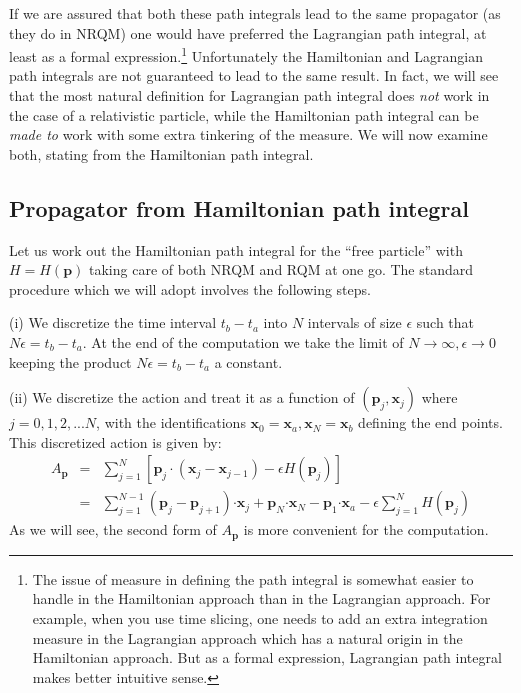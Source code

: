 \documentclass{article}
\begin{document}
 If we are assured that both these path integrals lead to the same propagator (as they do in NRQM) one would have  preferred the Lagrangian path integral, at least as a formal expression.\footnote{The issue of measure in defining the path integral is somewhat easier to handle in the Hamiltonian approach than in the Lagrangian approach. For example, when you use time slicing, one needs to add an extra integration measure in the Lagrangian approach which has a natural origin in the Hamiltonian approach. But as a formal expression, Lagrangian path integral makes better intuitive sense.} Unfortunately the Hamiltonian and Lagrangian path integrals are not guaranteed to lead to the same result. In fact, we will see that the most natural definition for Lagrangian path integral does \textit{not}  work in the case of a relativistic particle, while the Hamiltonian path integral can be \textit{made to} work with some extra tinkering of the measure. We will now examine both, stating from the Hamiltonian path integral. 
 
\subsection{Propagator from Hamiltonian path integral}\label{sec:hpi} 
 
Let us work out the Hamiltonian path integral for the ``free particle'' with $H=H(\bm{p})$ taking care of both NRQM and RQM at one go. The standard procedure which we will adopt involves the following steps. 

(i) We discretize the time interval $t_b-t_a$ into $N$ intervals of size $\epsilon$ such that $N\epsilon=t_b-t_a$. At the end of the computation we take the limit of $N\to\infty, \epsilon\to0$ keeping the product $N\epsilon=t_b-t_a$ a constant. 

(ii) We discretize  the action and treat it as a function of $(\bm{p}_j,\bm{x}_j)$ where $j=0,1,2,...N$, with the identifications $\bm{x}_0=\bm{x}_a,\bm{x}_N=\bm{x}_b$ defining the end points. This discretized action is given by:
\begin{eqnarray}
 A_{\bm{p}}&=&\sum_{j=1}^N \left[ \bm{p}_j\cdot (\bm{x}_j-\bm{x}_{j-1}) -\epsilon H(\bm{p}_j)\right]\nonumber\\
 &=& \sum_{j=1}^{N-1} \left( \bm{p}_j - \bm{p}_{j+1} \right)\bm{\cdot x}_j+ \bm{p}_N \bm{\cdot x}_N - \bm{p}_1\bm{\cdot x}_a - \epsilon \sum_{j=1}^{N} H(\bm{p}_j)
 \label{discaction}
\end{eqnarray} 
As we will see, the second form of  $A_{\bm{p}}$ is more convenient for the computation.
\end{document}
